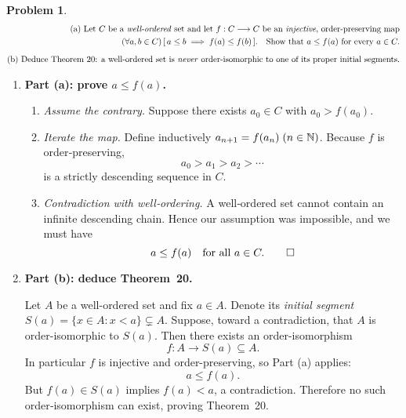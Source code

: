 \documentclass[12pt]{article}
\theoremstyle{definition} %
\newtheorem{problem}{Problem}
\theoremstyle{plain} %
\begin{document}
\begin{problem}
    \begin{align}
        \text{(a) Let $C$ be a \emph{well‑ordered} set and let }
        f:C\longrightarrow C
        \text{ be an \emph{injective}, order‑preserving map}\\
        (\forall a,b\in C)\,[\,a\le b \;\Longrightarrow\; f(a)\le f(b)\,].
        \quad\text{Show that } a\le f(a)\text{ for every }a\in C.\\[6pt]
        \text{(b) Deduce Theorem~20: a well‑ordered set is \emph{never}
        order‑isomorphic to one of its proper initial segments.}
    \end{align}

    \begin{enumerate}
    \item \textbf{Part (a): prove $a\le f(a)$.}

          \begin{enumerate}
              \item \emph{Assume the contrary.}  
                    Suppose there exists $a_{0}\in C$ with
                    $a_{0}>f(a_{0})$.

              \item \emph{Iterate the map.}  
                    Define inductively
                    $a_{n+1}=f(a_{n})\;(n\in\Bbb N)$.  
                    Because $f$ is order‑preserving,
                    \[
                        a_{0}>a_{1}>a_{2}>\dotsb
                    \]
                    is a strictly descending sequence in $C$.

              \item \emph{Contradiction with well‑ordering.}  
                    A well‑ordered set cannot contain an infinite
                    descending chain.  
                    Hence our assumption was impossible, and we must have
                    \[
                        a\le f(a)\quad\text{for all }a\in C.\qedhere
                    \]
          \end{enumerate}

    \item \textbf{Part (b): deduce Theorem~20.}

          Let $A$ be a well-ordered set and fix $a\in A$.
          Denote its \emph{initial segment}
          \(
              S(a)=\{x\in A : x<a\}\subsetneq A.
          \)
          Suppose, toward a contradiction, that $A$ is order-isomorphic
          to $S(a)$.  
          Then there exists an order-isomorphism
          \[
              f:A\longrightarrow S(a)\subseteq A.
          \]
          In particular $f$ is injective and order-preserving, so Part (a)
          applies:
          \[
              a\le f(a).
          \]
          But $f(a)\in S(a)$ implies $f(a)<a$, a contradiction.
          Therefore no such order‑isomorphism can exist, proving
          Theorem~20.
    \end{enumerate}
\end{problem}
\end{document}
